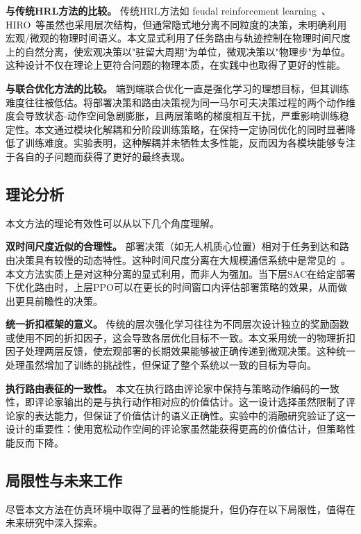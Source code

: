 \textbf{与传统HRL方法的比较。} 传统HRL方法如 feudal reinforcement learning~\citep{dayan1993feudal}、HIRO~\citep{nachum2018data}等虽然也采用层次结构，但通常隐式地分离不同粒度的决策，未明确利用宏观/微观的物理时间语义。本文显式利用了任务路由与轨迹控制在物理时间尺度上的自然分离，使宏观决策以"驻留大周期"为单位，微观决策以"物理步"为单位。这种设计不仅在理论上更符合问题的物理本质，在实践中也取得了更好的性能。

\textbf{与联合优化方法的比较。} 端到端联合优化一直是强化学习的理想目标，但其训练难度往往被低估。将部署决策和路由决策视为同一马尔可夫决策过程的两个动作维度会导致状态-动作空间急剧膨胀，且两层策略的梯度相互干扰，严重影响训练稳定性。本文通过模块化解耦和分阶段训练策略，在保持一定协同优化的同时显著降低了训练难度。实验表明，这种解耦并未牺牲太多性能，反而因为各模块能够专注于各自的子问题而获得了更好的最终表现。

\subsection{理论分析}

本文方法的理论有效性可以从以下几个角度理解。

\textbf{双时间尺度近似的合理性。} 部署决策（如无人机质心位置）相对于任务到达和路由决策具有较慢的动态特性。这种时间尺度分离在大规模通信系统中是常见的~\citep{neely2005stochastic}。本文方法实质上是对这种分离的显式利用，而非人为强加。当下层SAC在给定部署下优化路由时，上层PPO可以在更长的时间窗口内评估部署策略的效果，从而做出更具前瞻性的决策。

\textbf{统一折扣框架的意义。} 传统的层次强化学习往往为不同层次设计独立的奖励函数或使用不同的折扣因子，这会导致各层优化目标不一致。本文采用统一的物理折扣因子处理两层反馈，使宏观部署的长期效果能够被正确传递到微观决策。这种统一处理虽然增加了训练的挑战性，但保证了整个系统以一致的目标为导向。

\textbf{执行路由表征的一致性。} 本文在执行路由评论家中保持与策略动作编码的一致性，即评论家输出的是与执行动作相对应的价值估计。这一设计选择虽然限制了评论家的表达能力，但保证了价值估计的语义正确性。实验中的消融研究验证了这一设计的重要性：使用宽松动作空间的评论家虽然能获得更高的价值估计，但策略性能反而下降。

\subsection{局限性与未来工作}

尽管本文方法在仿真环境中取得了显著的性能提升，但仍存在以下局限性，值得在未来研究中深入探索。

